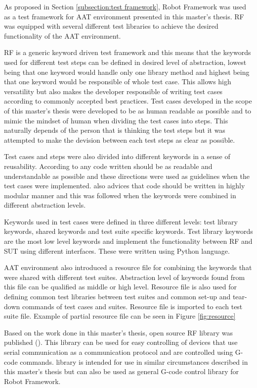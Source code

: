 As proposed in Section \ref{subsection:test framework}, Robot Framework was used as a test framework for AAT environment presented in this master's thesis. RF was equipped with several different test libraries to achieve the desired functionality of the AAT environment.

RF is a generic keyword driven test framework and this means that the keywords used for different test steps can be defined in desired level of abstraction, lowest being that one keyword would handle only one library method and highest being that one keyword would be responsible of whole test case. This allows high versatility but also makes the developer responsible of writing test cases according to commonly accepted best practices. Test cases developed in the scope of this master's thesis were developed to be as human readable as possible and to mimic the mindset of human when dividing the test cases into steps. This naturally depends of the person that is thinking the test steps but it was attempted to make the devision between each test steps as clear as possible.

Test cases and steps were also divided into different keywords in a sense of reusability. According to \emph{\cite{clean-code}} any code written should be as readable and understandable as possible and these directions were used as guidelines when the test cases were implemented. \emph{\cite{clean-code}} also advices that code should be written in highly modular manner and this was followed when the keywords were combined in different abstraction levels.

Keywords used in test cases were defined in three different levels: test library keywords, shared keywords and test suite specific keywords. Test library keywords are the most low level keywords and implement the functionality between RF and SUT using different interfaces. These were written using Python language. 

AAT environment also introduced a resource file for combining the keywords that were shared with different test suites. Abstraction level of keywords found from this file can be qualified as middle or high level. Resource file is also used for defining common test libraries between test suites and common set-up and tear-down commands of test cases and suites. Resource file is imported to each test suite file. Example of partial resource file can be seen in Figure \ref{fig:resource}

Based on the work done in this master's thesis, open source RF library was published (\emph{\cite{cnc-library}}). This library can be used for easy controlling of devices that use serial communication as a communication protocol and are controlled using G-code commands. library is intended for use in similar circumstances described in this master's thesis but can also be used as general G-code control library for Robot Framework.

